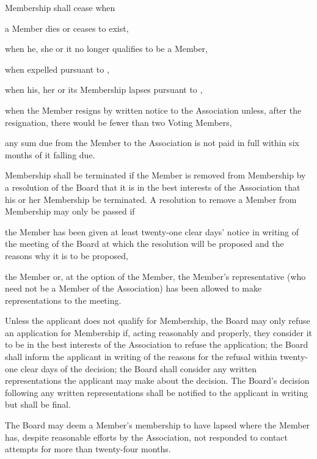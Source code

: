 \documentclass[10pt]{mk-articles-of-association}
\newcommand{\EC}[0]{Board}
\newcommand{\Exec}[0]{\EC{} }
\begin{document}
\begin{constenum}

  \item
    Membership shall cease when
    \begin{constenum}
      \item a Member dies or ceases to exist,
      \item when he, she or it no longer qualifies to be a Member,
      \item when expelled pursuant to ,
      \item when his, her or its Membership lapses pursuant to
        ,
      \item when the Member resigns by written notice to the
        Association unless, after the resignation, there would be
        fewer than two Voting Members, \ITor{}
      \item any sum due from the Member to the Association is not paid in full
        within six months of it falling due.
    \end{constenum}

\item Membership shall be terminated if
\label{expulsion}
  the Member is removed from Membership by a resolution of the
  \Exec that it is in the best interests of the Association that his or
  her Membership be terminated. A resolution to remove a Member from
  Membership may only be passed if

\begin{constenum}

\item the Member has been given at least twenty-one clear days' notice in
  writing of the meeting of the \Exec at which the resolution will
  be proposed and the reasons why it is to be proposed,

\item the Member or, at the option of the Member, the Member's
  representative (who need not be a Member of the Association) has been
  allowed to make representations to the meeting.

\end{constenum}

\item
  Unless the applicant does not qualify for Membership, the \Exec
  may only refuse an application for Membership if, acting
  reasonably and properly, they consider it to be in the best
  interests of the Association to refuse the application; the \Exec
  shall inform the applicant in writing of the reasons for the
  refusal within twenty-one clear days of the decision; the \Exec
  shall consider any written representations the applicant may make
  about the decision. The \EC's decision following any written
  representations shall be notified to the applicant in writing but
  shall be final.

\item The \Exec may deem a Member's membership to have lapsed where
  the Member has, despite reasonable efforts by the Association, not
  responded to contact attempts for more than twenty-four months.
  \label{lapse}

\end{constenum}

\end{document}
